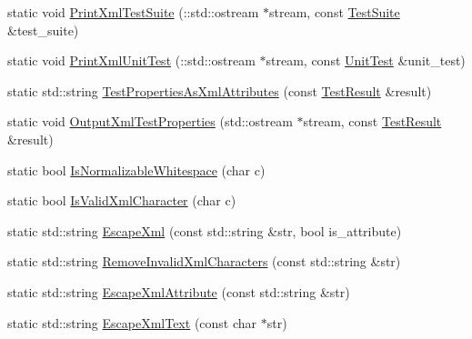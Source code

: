 \begin{DoxyCompactItemize}
\item 
static void \mbox{\hyperlink{classtesting_1_1internal_1_1_xml_unit_test_result_printer_a6d86bfb622255dc08c10311da5cb8f04}{Print\+Xml\+Test\+Suite}} (\+::std\+::ostream $\ast$stream, const \mbox{\hyperlink{classtesting_1_1_test_suite}{Test\+Suite}} \&test\+\_\+suite)
\item 
static void \mbox{\hyperlink{classtesting_1_1internal_1_1_xml_unit_test_result_printer_acd8c9f3bd2e7eb1aa4170d61559c1a1a}{Print\+Xml\+Unit\+Test}} (\+::std\+::ostream $\ast$stream, const \mbox{\hyperlink{classtesting_1_1_unit_test}{Unit\+Test}} \&unit\+\_\+test)
\item 
static std\+::string \mbox{\hyperlink{classtesting_1_1internal_1_1_xml_unit_test_result_printer_aaac4f1352a2cc46f6a69994d45999f0b}{Test\+Properties\+As\+Xml\+Attributes}} (const \mbox{\hyperlink{classtesting_1_1_test_result}{Test\+Result}} \&result)
\item 
static void \mbox{\hyperlink{classtesting_1_1internal_1_1_xml_unit_test_result_printer_a69b5b7ac1b8236760790768be5ebb218}{Output\+Xml\+Test\+Properties}} (std\+::ostream $\ast$stream, const \mbox{\hyperlink{classtesting_1_1_test_result}{Test\+Result}} \&result)
\item 
static bool \mbox{\hyperlink{classtesting_1_1internal_1_1_xml_unit_test_result_printer_af9d5af6e5d0c505d5c3bd50a8d2a8d76}{Is\+Normalizable\+Whitespace}} (char c)
\item 
static bool \mbox{\hyperlink{classtesting_1_1internal_1_1_xml_unit_test_result_printer_a2b83a24e3ec8544efa1156f9d6e51873}{Is\+Valid\+Xml\+Character}} (char c)
\item 
static std\+::string \mbox{\hyperlink{classtesting_1_1internal_1_1_xml_unit_test_result_printer_a7f3312312208d937ffd4a4ee461bfde9}{Escape\+Xml}} (const std\+::string \&str, bool is\+\_\+attribute)
\item 
static std\+::string \mbox{\hyperlink{classtesting_1_1internal_1_1_xml_unit_test_result_printer_abbdc9836847322cb699d817973e57bac}{Remove\+Invalid\+Xml\+Characters}} (const std\+::string \&str)
\item 
static std\+::string \mbox{\hyperlink{classtesting_1_1internal_1_1_xml_unit_test_result_printer_aad574d7bb0c24578d5acc57817b9d367}{Escape\+Xml\+Attribute}} (const std\+::string \&str)
\item 
static std\+::string \mbox{\hyperlink{classtesting_1_1internal_1_1_xml_unit_test_result_printer_a934486bda28e7013f2d07520d5098a31}{Escape\+Xml\+Text}} (const char $\ast$str)
\item 

\end{DoxyCompactItemize}
